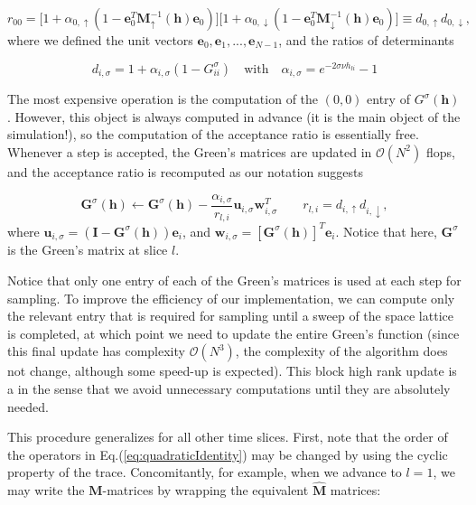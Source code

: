 \begin{equation}
r_{0 0} = \bigg[ 1 + \alpha_{0, \uparrow} ( 1 - \bm e_0^T \bm M_\uparrow^{-1} ( \bm h ) \bm e_0 ) \bigg] \bigg[ 1 + \alpha_{0, \downarrow} ( 1 - \bm e_0^T \bm M_\downarrow^{-1} ( \bm h ) \bm e_0 ) \bigg] \equiv d_{0, \uparrow} d_{0, \downarrow} ,
\end{equation}
where we defined the unit vectors $\bm e_0, \bm e_1, ..., \bm e_{N-1}$, and the ratios of determinants

\begin{equation*}
d_{i, \sigma} = 1 + \alpha_{i, \sigma} ( 1 - G^\sigma_{i i} ) \quad \text{with} \quad \alpha_{i, \sigma} = e^{-2 \sigma \nu h_{l i}} - 1
\end{equation*}

The most expensive operation is the computation of the $(0, 0)$ entry of $G^\sigma (\bm h)$.
However, this object is always computed in advance (it is the main object of the simulation!), so the computation of the acceptance ratio is essentially free.
Whenever a step is accepted, the Green's matrices are updated in $\mathcal{O}(N^2)$ flops, and the acceptance ratio is recomputed as our notation suggests

\begin{equation}
\bm G^\sigma ( \bm h ) \leftarrow \bm G^\sigma ( \bm h ) - \frac{\alpha_{i, \sigma}}{r_{l, i}} \bm u_{i, \sigma} \bm w_{i, \sigma}^T \quad \quad r_{l,i} = d_{i, \uparrow} d_{i, \downarrow} ,
\end{equation}
where $\bm u_{i, \sigma} = ( \bm I - \bm G^\sigma ( \bm h ) ) \bm e_i$, and $\bm w_{i, \sigma} = [ \bm G^\sigma (\bm h) ]^T \bm e_i$.
Notice that here, $\bm G^\sigma$ is the Green's matrix at slice $l$.

Notice that only one entry of each of the Green's matrices is used at each step for sampling.
To improve the efficiency of our implementation, we can compute only the relevant entry that is required for sampling until a sweep of the space lattice is completed, at which point we need to update the entire Green's function (since this final update has complexity $\mathcal{O}(N^3)$, the complexity of the algorithm does not change, although some speed-up is expected).
This block high rank update is a   in the sense that we avoid unnecessary computations until they are absolutely needed.

This procedure generalizes for all other time slices.
First, note that the order of the operators in Eq.(\ref{eq:quadraticIdentity}) may be changed by using the cyclic property of the trace.
Concomitantly, for example, when we advance to $l = 1$, we may write the $\bm M$-matrices by wrapping the equivalent $\widehat{\bm M}$ matrices:


